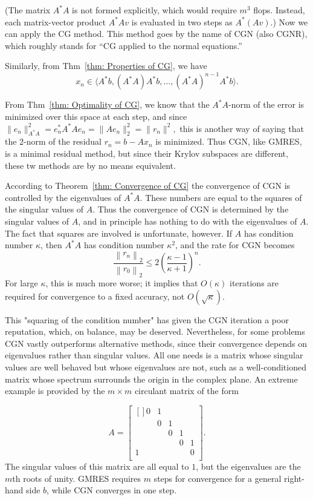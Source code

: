 (The matrix $A^* A$ is not formed explicitly, which would require $m^3$ flops. Instead, each matrix-vector product $A^* A v$ is evaluated in two steps as $A^*(A v)$.) Now we can apply the CG method. This method goes by the name of CGN (also CGNR), which roughly stands for ``CG applied to the normal equations.''

Similarly, from Thm~\ref{thm: Properties of CG}, we have 
\[
    x_n \in \langle A^* b, (A^* A)A^* b, \ldots , (A^* A)^{n-1}A^* b \rangle .
\]

From Thm~\ref{thm: Optimality of CG}, we know that the $ A^* A $-norm of the error is minimized over this space at each step, and since $ \|e_n\|_{A^* A}^{2}  = e_n^* A^* A e_n = \|Ae_n\|_2^{2}  = \|r_n\|^{2} , $ this is another way of saying that the 2-norm of the residual $ r_n=b-Ax_n $ is minimized. Thus CGN, like GMRES, is a minimal residual method, but since their Krylov subspaces are different, these tw methods are by no means equivalent.  

According to Theorem~\ref{thm: Convergence of CG} the convergence of CGN is controlled by the eigenvalues of $A^* A$. These numbers are equal to the squares of the singular values of $A$. Thus the convergence of CGN is determined by the singular values of $A$, and in principle has nothing to do with the eigenvalues of $A$. The fact that squares are involved is unfortunate, however. If $A$ has condition number $\kappa$, then $A^* A$ has condition number $\kappa^2$, and the rate for CGN becomes
$$
\frac{\left\|r_n\right\|_2}{\left\|r_0\right\|_2} \leq 2\left(\frac{\kappa-1}{\kappa+1}\right)^n.
$$
For large $\kappa$, this is much more worse; it implies that $O(\kappa)$ iterations are required for convergence to a fixed accuracy, not $O(\sqrt{\kappa})$. 

This "squaring of the condition number" has given the CGN iteration a poor reputation, which, on balance, may be deserved. Nevertheless, for some problems CGN vastly outperforms alternative methods, since their convergence depends on eigenvalues rather than singular values. All one needs is a matrix whose singular values are well behaved but whose eigenvalues are not, such as a well-conditioned matrix whose spectrum surrounds the origin in the complex plane. An extreme example is provided by the $m \times m$ circulant matrix of the form

\[
    A = \begin{bmatrix}[] 
        0 & 1 &  &  &   \\
         & 0 & 1 &  &   \\
         &  & 0 & 1 &   \\
         &  &  & 0 &  1 \\
        1 &  &  &  &  0 \\
    \end{bmatrix}. 
\]
The singular values of this matrix are all equal to $ 1 $, but the eigenvalues are the $ m $th roots of unity. GMRES requires $ m $ steps for convergence for a general right-hand side $ b $, while CGN converges in one step. 

